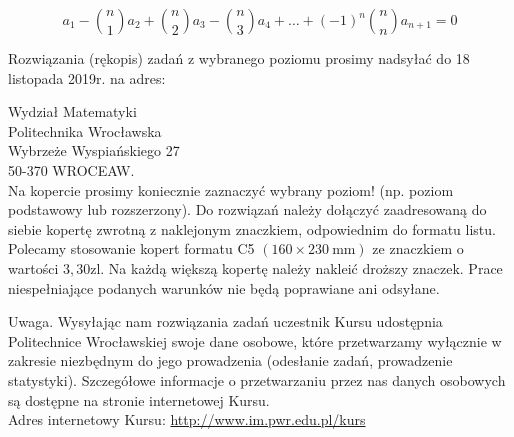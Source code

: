 \documentclass[10pt]{article}
\begin{document}
$$
a_{1}-\binom{n}{1} a_{2}+\binom{n}{2} a_{3}-\binom{n}{3} a_{4}+\ldots+(-1)^{n}\binom{n}{n} a_{n+1}=0
$$

Rozwiązania (rękopis) zadań z wybranego poziomu prosimy nadsyłać do 18 listopada 2019r. na adres:

Wydział Matematyki\\
Politechnika Wrocławska\\
Wybrzeże Wyspiańskiego 27\\
50-370 WROCEAW.\\
Na kopercie prosimy koniecznie zaznaczyć wybrany poziom! (np. poziom podstawowy lub rozszerzony). Do rozwiązań należy dołączyć zaadresowaną do siebie kopertę zwrotną z naklejonym znaczkiem, odpowiednim do formatu listu. Polecamy stosowanie kopert formatu C5 $(160 \times 230 \mathrm{~mm})$ ze znaczkiem o wartości $3,30 \mathrm{zl}$. Na każdą większą kopertę należy nakleić droższy znaczek. Prace niespełniające podanych warunków nie będą poprawiane ani odsyłane.

Uwaga. Wysyłając nam rozwiązania zadań uczestnik Kursu udostępnia Politechnice Wrocławskiej swoje dane osobowe, które przetwarzamy wyłącznie w zakresie niezbędnym do jego prowadzenia (odesłanie zadań, prowadzenie statystyki). Szczegółowe informacje o przetwarzaniu przez nas danych osobowych są dostępne na stronie internetowej Kursu.\\
Adres internetowy Kursu: \href{http://www.im.pwr.edu.pl/kurs}{http://www.im.pwr.edu.pl/kurs}
\end{document}
